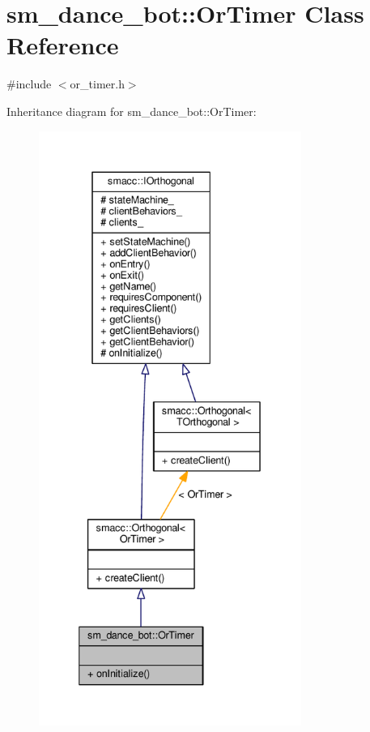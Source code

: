 \hypertarget{classsm__dance__bot_1_1OrTimer}{}\section{sm\+\_\+dance\+\_\+bot\+:\+:Or\+Timer Class Reference}
\label{classsm__dance__bot_1_1OrTimer}


{\ttfamily \#include $<$or\+\_\+timer.\+h$>$}



Inheritance diagram for sm\+\_\+dance\+\_\+bot\+:\+:Or\+Timer\+:\nopagebreak
\begin{figure}[H]
\begin{center}
\leavevmode
\includegraphics[height=550pt]{classsm__dance__bot_1_1OrTimer__inherit__graph}
\end{center}
\end{figure}


